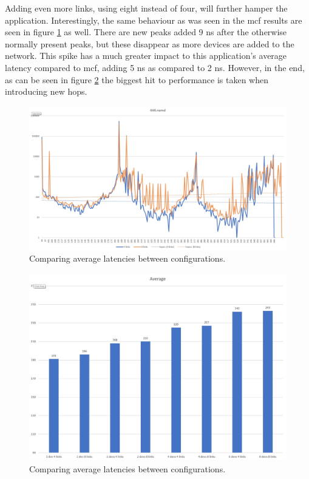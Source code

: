 Adding even more links, using eight instead of four, will further hamper the application. Interestingly, the same behaviour as was seen in the mcf results are seen in figure \ref{Memory-access-444-links-compare} as well. There are new peaks added 9 ns after the otherwise normally present peaks, but these disappear as more devices are added to the network. This spike has a much greater impact to this application's average latency compared to mcf, adding 5 ns as compared to 2 ns. However, in the end, as can be seen in figure \ref{Memory-access-444-average-latency} the biggest hit to performance is taken when introducing new hops. 

\begin{figure}[!ht]
    \centering
    \includegraphics[width=0.75\linewidth]{figure/444-2_4-8.jpg}
    \caption{Comparing average latencies between configurations.}
    \label{Memory-access-444-links-compare}
\end{figure}
\begin{figure}[!ht]
    \centering
    \includegraphics[width=0.75\linewidth]{figure/444_averages.jpg}
    \caption{Comparing average latencies between configurations.}
    \label{Memory-access-444-average-latency}
\end{figure}

